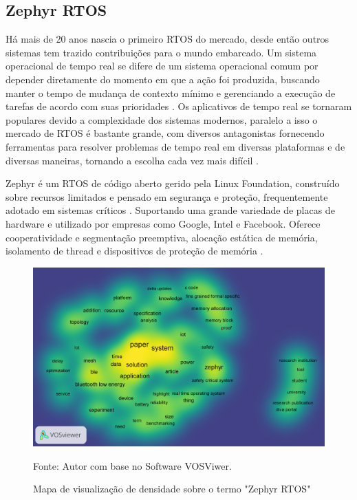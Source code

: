 \subsection{Zephyr RTOS}
Há mais de 20 anos nascia o primeiro RTOS do mercado, desde então outros sistemas tem trazido 
contribuições para o mundo embarcado. Um sistema operacional de tempo real se difere de um sistema 
operacional comum por depender diretamente do momento em que a ação foi produzida, buscando 
manter o tempo de mudança de contexto mínimo e gerenciando a execução de tarefas de acordo com 
suas prioridades \cite{Hambarde}. Os aplicativos de tempo real se tornaram populares devido a 
complexidade dos sistemas modernos, paralelo a isso o mercado de RTOS é bastante grande, com 
diversos antagonistas fornecendo ferramentas para resolver problemas de tempo real em diversas 
plataformas e de diversas maneiras, tornando a escolha cada vez mais difícil \cite{Hambarde}.


Zephyr é um RTOS de código aberto gerido pela Linux Foundation, construído sobre recursos
limitados e pensado em segurança e proteção, frequentemente adotado em sistemas críticos \cite{Zhao}.
Suportando uma grande variedade de placas de hardware e utilizado por empresas como Google, Intel
e Facebook. Oferece cooperatividade e segmentação preemptiva, alocação estática de memória,
isolamento de thread e dispositivos de proteção de memória \cite{nyffenegger2020connecting}.

\begin{figure}[H]
	\centering
	\includegraphics[width=15cm]{imagens/Zephyr_RTOS_Density_Visualization.png}
	\caption{Mapa de visualização de densidade sobre o termo "Zephyr RTOS"}
	Fonte: Autor com base no Software VOSViwer.
	\label{fig: Zephyr Density Visualization}
\end{figure}

